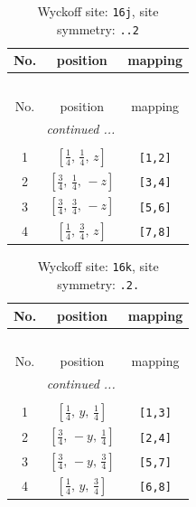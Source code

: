 \documentclass[fleqn,8pt]{jsarticle}
\begin{document}
\renewcommand{\arraystretch}{1.2}
\begin{longtable}{ccc}
\caption{Wyckoff site: {\tt 16j}, site symmetry: {\tt ..2}}
 \\
 \hline \hline
No. & position & mapping \\ \hline \endfirsthead

\multicolumn{2}{l}{\tablename\ \thetable{}} \\
 \hline \hline
No. & position & mapping \\ \hline \endhead

 \hline \hline
\multicolumn{2}{r}{\footnotesize\it continued ...} \\ \endfoot

 \hline \hline
\multicolumn{2}{r}{} \\ \endlastfoot

1 & $\left[ \frac{1}{4},\, \frac{1}{4},\, z \right]$ & {\tt [1,2]} \\ \hline
2 & $\left[ \frac{3}{4},\, \frac{1}{4},\, - z \right]$ & {\tt [3,4]} \\ \hline
3 & $\left[ \frac{3}{4},\, \frac{3}{4},\, - z \right]$ & {\tt [5,6]} \\ \hline
4 & $\left[ \frac{1}{4},\, \frac{3}{4},\, z \right]$ & {\tt [7,8]} \\
\end{longtable}
\renewcommand{\arraystretch}{1.2}
\begin{longtable}{ccc}
\caption{Wyckoff site: {\tt 16k}, site symmetry: {\tt .2.}}
 \\
 \hline \hline
No. & position & mapping \\ \hline \endfirsthead

\multicolumn{2}{l}{\tablename\ \thetable{}} \\
 \hline \hline
No. & position & mapping \\ \hline \endhead

 \hline \hline
\multicolumn{2}{r}{\footnotesize\it continued ...} \\ \endfoot

 \hline \hline
\multicolumn{2}{r}{} \\ \endlastfoot

1 & $\left[ \frac{1}{4},\, y,\, \frac{1}{4} \right]$ & {\tt [1,3]} \\ \hline
2 & $\left[ \frac{3}{4},\, - y,\, \frac{1}{4} \right]$ & {\tt [2,4]} \\ \hline
3 & $\left[ \frac{3}{4},\, - y,\, \frac{3}{4} \right]$ & {\tt [5,7]} \\ \hline
4 & $\left[ \frac{1}{4},\, y,\, \frac{3}{4} \right]$ & {\tt [6,8]} \\
\end{longtable}
\end{document}
